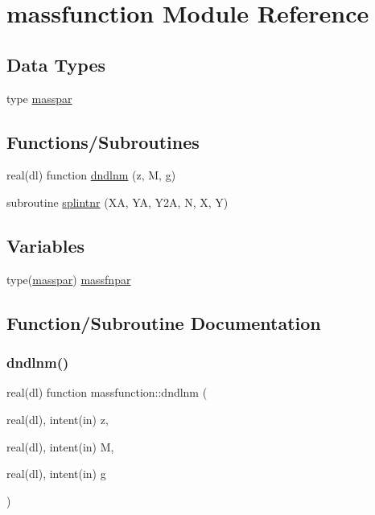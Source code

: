 \hypertarget{namespacemassfunction}{}\section{massfunction Module Reference}
\label{namespacemassfunction}
\subsection*{Data Types}
\begin{DoxyCompactItemize}
\item 
type \mbox{\hyperlink{structmassfunction_1_1masspar}{masspar}}
\end{DoxyCompactItemize}
\subsection*{Functions/\+Subroutines}
\begin{DoxyCompactItemize}
\item 
real(dl) function \mbox{\hyperlink{namespacemassfunction_a7388d3e1cd459ef602a588f13111b6f4}{dndlnm}} (z, M, g)
\item 
subroutine \mbox{\hyperlink{namespacemassfunction_a64c53fdad2880885e6d900d266bd160e}{splintnr}} (XA, YA, Y2A, N, X, Y)
\end{DoxyCompactItemize}
\subsection*{Variables}
\begin{DoxyCompactItemize}
\item 
type(\mbox{\hyperlink{structmassfunction_1_1masspar}{masspar}}) \mbox{\hyperlink{namespacemassfunction_ac3284bedbb7a589297bf6557a10e6f30}{massfnpar}}
\end{DoxyCompactItemize}


\subsection{Function/\+Subroutine Documentation}
\mbox{\label{namespacemassfunction_a7388d3e1cd459ef602a588f13111b6f4}} 
\subsubsection{\texorpdfstring{dndlnm()}{dndlnm()}}
{\footnotesize\ttfamily real(dl) function massfunction\+::dndlnm (\begin{DoxyParamCaption}\item[{real(dl), intent(in)}]{z,  }\item[{real(dl), intent(in)}]{M,  }\item[{real(dl), intent(in)}]{g }\end{DoxyParamCaption})}



